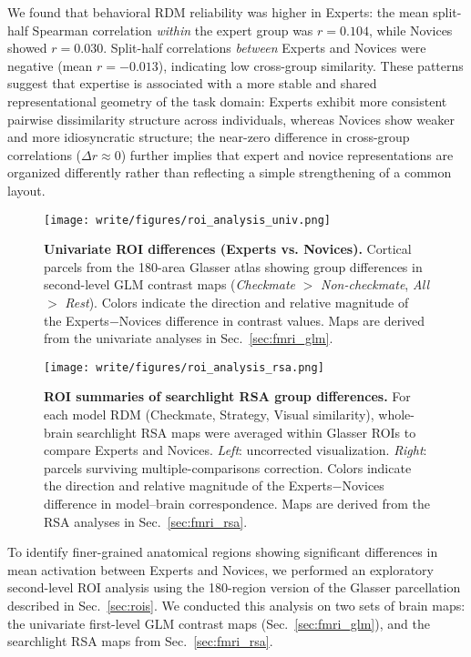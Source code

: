 We found that behavioral RDM reliability was higher in Experts: the mean split-half Spearman correlation \emph{within} the expert group was $r = 0.104$, while Novices showed $r = 0.030$. Split-half correlations \emph{between} Experts and Novices were negative (mean $r = -0.013$), indicating low cross-group similarity. These patterns suggest that expertise is associated with a more stable and shared representational geometry of the task domain: Experts exhibit more consistent pairwise dissimilarity structure across individuals, whereas Novices show weaker and more idiosyncratic structure; the near-zero difference in cross-group correlations ($\Delta r \approx 0$) further implies that expert and novice representations are organized differently rather than reflecting a simple strengthening of a common layout.

\begin{figure}[!htp]
  \centering
  \texttt{[image: write/figures/roi\_analysis\_univ.png]}
  \caption{\textbf{Univariate ROI differences (Experts vs. Novices).} Cortical parcels from the 180-area Glasser atlas showing group differences in second-level GLM contrast maps (\emph{Checkmate} $>$ \emph{Non-checkmate}, \emph{All} $>$ \emph{Rest}). Colors indicate the direction and relative magnitude of the Experts$-$Novices difference in contrast values. Maps are derived from the univariate analyses in Sec.~\ref{sec:fmri_glm}.}
  \label{suppfig:roi_analysis_univ}
\end{figure}

\begin{figure}[!htp]
  \centering
  \texttt{[image: write/figures/roi\_analysis\_rsa.png]}
  \caption{\textbf{ROI summaries of searchlight RSA group differences.} For each model RDM (Checkmate, Strategy, Visual similarity), whole-brain searchlight RSA maps were averaged within Glasser ROIs to compare Experts and Novices. \emph{Left}: uncorrected visualization. \emph{Right}: parcels surviving multiple-comparisons correction. Colors indicate the direction and relative magnitude of the Experts$-$Novices difference in model–brain correspondence. Maps are derived from the RSA analyses in Sec.~\ref{sec:fmri_rsa}.}
  \label{suppfig:roi_analysis_rsa}
\end{figure}

\label{suppsec:roi_analysis}

To identify finer-grained anatomical regions showing significant differences in mean activation between Experts and Novices, we performed an exploratory second-level ROI analysis using the 180-region version of the Glasser parcellation described in Sec.~\ref{sec:rois}. We conducted this analysis on two sets of brain maps: the univariate first-level GLM contrast maps (Sec.~\ref{sec:fmri_glm}), and the searchlight RSA maps from Sec.~\ref{sec:fmri_rsa}. 

